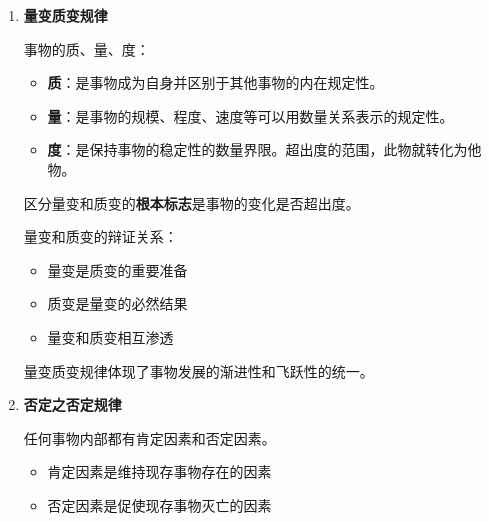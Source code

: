 \documentclass[12pt, a4paper, oneside]{ctexart}
\begin{document}
\begin{enumerate}
  \item {\bf 量变质变规律}
  
  事物的质、量、度：
  \begin{itemize}
    \item {\bf 质}：是事物成为自身并区别于其他事物的内在规定性。
    \item {\bf 量}：是事物的规模、程度、速度等可以用数量关系表示的规定性。
    \item {\bf 度}：是保持事物的稳定性的数量界限。超出度的范围，此物就转化为他物。
  \end{itemize}

  区分量变和质变的\textbf{根本标志}是事物的变化是否超出度。

  量变和质变的辩证关系：
  \begin{itemize}
    \item 量变是质变的重要准备
    \item 质变是量变的必然结果
    \item 量变和质变相互渗透
  \end{itemize}

  量变质变规律体现了事物发展的渐进性和飞跃性的统一。

  \item {\bf 否定之否定规律}
  
  任何事物内部都有肯定因素和否定因素。
  \begin{itemize}
    \item 肯定因素是维持现存事物存在的因素
    \item 否定因素是促使现存事物灭亡的因素
  \end{itemize}
\end{enumerate}
\end{document}
